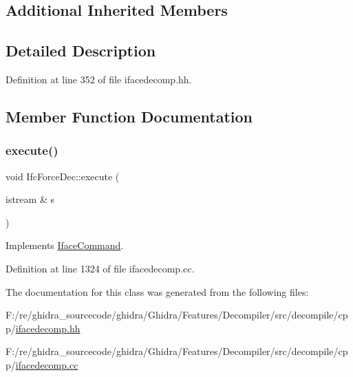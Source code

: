 \subsection*{Additional Inherited Members}


\subsection{Detailed Description}


Definition at line 352 of file ifacedecomp.\+hh.



\subsection{Member Function Documentation}
\mbox{\label{class_ifc_force_dec_a3dd7a4c7396bae9c375317b916057d9d}} 
\subsubsection{\texorpdfstring{execute()}{execute()}}
{\footnotesize\ttfamily void Ifc\+Force\+Dec\+::execute (\begin{DoxyParamCaption}\item[{istream \&}]{s }\end{DoxyParamCaption})\hspace{0.3cm}{\ttfamily [virtual]}}



Implements \mbox{\hyperlink{class_iface_command_af10e29cee2c8e419de6efe9e680ad201}{Iface\+Command}}.



Definition at line 1324 of file ifacedecomp.\+cc.



The documentation for this class was generated from the following files\+:\begin{DoxyCompactItemize}
\item 
F\+:/re/ghidra\+\_\+sourcecode/ghidra/\+Ghidra/\+Features/\+Decompiler/src/decompile/cpp/\mbox{\hyperlink{ifacedecomp_8hh}{ifacedecomp.\+hh}}\item 
F\+:/re/ghidra\+\_\+sourcecode/ghidra/\+Ghidra/\+Features/\+Decompiler/src/decompile/cpp/\mbox{\hyperlink{ifacedecomp_8cc}{ifacedecomp.\+cc}}\end{DoxyCompactItemize}
